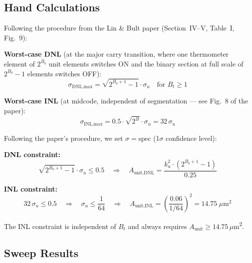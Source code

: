 \documentclass{article}
\begin{document}
\subsection{Hand Calculations}

Following the procedure from the Lin \& Bult paper (Section~IV--V, Table~I, Fig.~9):

\textbf{Worst-case DNL} (at the major carry transition, where one thermometer element of $2^{B_b}$ unit elements switches ON and the binary section at full scale of $2^{B_b}-1$ elements switches OFF):
\begin{equation}
    \sigma_{\text{DNL,max}} = \sqrt{2^{B_b+1} - 1} \cdot \sigma_u \quad \text{for } B_t \geq 1
\end{equation}

\textbf{Worst-case INL} (at midcode, independent of segmentation --- see Fig.~8 of the paper):
\begin{equation}
    \sigma_{\text{INL,max}} = 0.5 \cdot \sqrt{2^B} \cdot \sigma_u = 32\,\sigma_u
\end{equation}

Following the paper's procedure, we set $\sigma = \text{spec}$ (1$\sigma$ confidence level):

\textbf{DNL constraint:}
\begin{equation}
    \sqrt{2^{B_b+1}-1} \cdot \sigma_u \leq 0.5 \quad\Rightarrow\quad A_{\text{unit,DNL}} = \frac{k_u^2 \cdot (2^{B_b+1}-1)}{0.25}
\end{equation}

\textbf{INL constraint:}
\begin{equation}
    32\,\sigma_u \leq 0.5 \quad\Rightarrow\quad \sigma_u \leq \frac{1}{64} \quad\Rightarrow\quad A_{\text{unit,INL}} = \left(\frac{0.06}{1/64}\right)^2 = 14.75\;\mu\text{m}^2
\end{equation}

The INL constraint is independent of $B_t$ and always requires $A_\text{unit} \geq 14.75$\,$\mu$m\textsuperscript{2}.

\subsection{Sweep Results}
\end{document}
